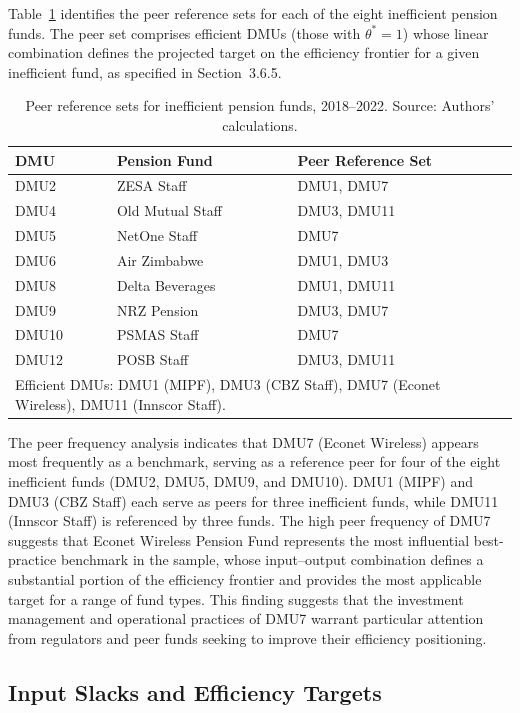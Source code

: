 \documentclass[12pt,a4paper]{article}
\begin{document}
Table~\ref{tab:peers} identifies the peer reference sets for each of the eight inefficient pension funds. The peer set comprises efficient DMUs (those with $\theta^* = 1$) whose linear combination defines the projected target on the efficiency frontier for a given inefficient fund, as specified in Section~3.6.5.

\begin{table}[H]
\centering
\caption{Peer reference sets for inefficient pension funds, 2018--2022. Source: Authors' calculations.}
\label{tab:peers}
\begin{tabular}{lll}
\toprule
\textbf{DMU} & \textbf{Pension Fund} & \textbf{Peer Reference Set} \\
\midrule
DMU2  & ZESA Staff       & DMU1, DMU7 \\
DMU4  & Old Mutual Staff & DMU3, DMU11 \\
DMU5  & NetOne Staff     & DMU7 \\
DMU6  & Air Zimbabwe     & DMU1, DMU3 \\
DMU8  & Delta Beverages  & DMU1, DMU11 \\
DMU9  & NRZ Pension      & DMU3, DMU7 \\
DMU10 & PSMAS Staff      & DMU7 \\
DMU12 & POSB Staff       & DMU3, DMU11 \\
\bottomrule
\multicolumn{3}{l}{\footnotesize Efficient DMUs: DMU1 (MIPF), DMU3 (CBZ Staff), DMU7 (Econet Wireless), DMU11 (Innscor Staff).}
\end{tabular}
\end{table}

The peer frequency analysis indicates that DMU7 (Econet Wireless) appears most frequently as a benchmark, serving as a reference peer for four of the eight inefficient funds (DMU2, DMU5, DMU9, and DMU10). DMU1 (MIPF) and DMU3 (CBZ Staff) each serve as peers for three inefficient funds, while DMU11 (Innscor Staff) is referenced by three funds. The high peer frequency of DMU7 suggests that Econet Wireless Pension Fund represents the most influential best-practice benchmark in the sample, whose input--output combination defines a substantial portion of the efficiency frontier and provides the most applicable target for a range of fund types. This finding suggests that the investment management and operational practices of DMU7 warrant particular attention from regulators and peer funds seeking to improve their efficiency positioning.

\subsection{Input Slacks and Efficiency Targets}
\end{document}
